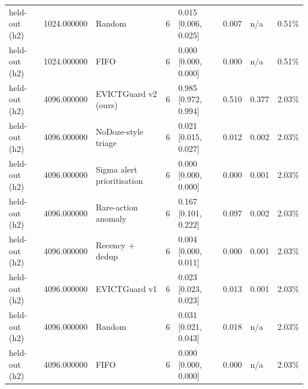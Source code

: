 \begin{tabular}{lrlrllll}
held-out (h2) & 1024.000000 & Random & 6 & 0.015 [0.006, 0.025] & 0.007 & n/a & 0.51\% \\
held-out (h2) & 1024.000000 & FIFO & 6 & 0.000 [0.000, 0.000] & 0.000 & n/a & 0.51\% \\
held-out (h2) & 4096.000000 & EVICTGuard v2 (ours) & 6 & 0.985 [0.972, 0.994] & 0.510 & 0.377 & 2.03\% \\
held-out (h2) & 4096.000000 & NoDoze-style triage & 6 & 0.021 [0.015, 0.027] & 0.012 & 0.002 & 2.03\% \\
held-out (h2) & 4096.000000 & Sigma alert prioritisation & 6 & 0.000 [0.000, 0.000] & 0.000 & 0.001 & 2.03\% \\
held-out (h2) & 4096.000000 & Rare-action anomaly & 6 & 0.167 [0.101, 0.222] & 0.097 & 0.002 & 2.03\% \\
held-out (h2) & 4096.000000 & Recency + dedup & 6 & 0.004 [0.000, 0.011] & 0.000 & 0.001 & 2.03\% \\
held-out (h2) & 4096.000000 & EVICTGuard v1 & 6 & 0.023 [0.023, 0.023] & 0.013 & 0.001 & 2.03\% \\
held-out (h2) & 4096.000000 & Random & 6 & 0.031 [0.021, 0.043] & 0.018 & n/a & 2.03\% \\
held-out (h2) & 4096.000000 & FIFO & 6 & 0.000 [0.000, 0.000] & 0.000 & n/a & 2.03\% \\
\bottomrule
\end{tabular}
